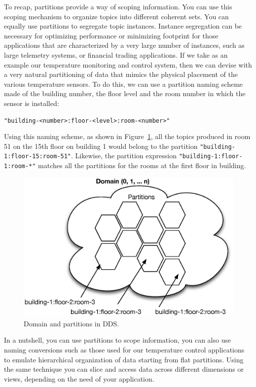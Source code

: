 To recap, partitions provide a way of scoping information. 
You can use this scoping mechanism to organize topics into different coherent sets. 
You can equally use partitions to segregate topic instances.  
Instance segregation can be necessary for optimizing performance or minimizing 
footprint for those applications that are characterized by a very large number 
of instances, such as large telemetry systems, or financial trading applications.
If we take as an example our temperature monitoring and control system, 
then we can devise with a very natural partitioning of data that mimics the 
physical placement of the various temperature sensors.  To do this, we can use 
a partition naming scheme made of the building number, the floor level and the 
room number in which the sensor is installed:
\begin{center}
  \texttt{"building-<number>:floor-<level>:room-<number>"}
\end{center}
Using this naming scheme, as shown in Figure~\ref{Figure:DDS:Partitions}, 
all the topics produced 
in room 51 on the 15th floor on building 1 would belong to the partition 
\texttt{"building-1:floor-15:room-51"}. Likewise, the partition expression 
\texttt{"building-1:floor-1:room-*"} matches all the partitions for the rooms at 
the first floor in building.
\begin{figure}[t]
	\centering
	\includegraphics[scale=0.7]{figs/domain-partitions.eps}
	\caption{Domain and partitions in DDS.}
	\label{Figure:DDS:Partitions}
\end{figure}

In a nutshell,  you can use partitions to scope information, you can also 
use naming conversions such as those used for our temperature control 
applications to emulate hierarchical organization of data starting from 
flat partitions. Using the same technique you can slice and access data 
across different dimensions or views, depending on the need of your application.
